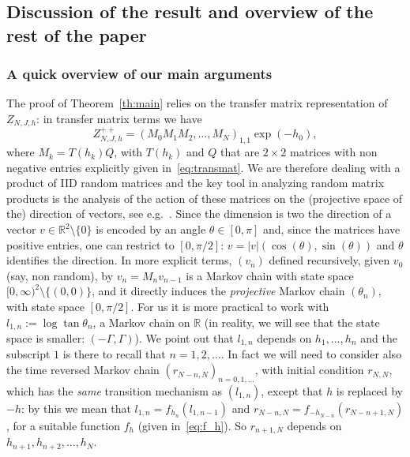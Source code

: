 \documentclass[10pt]{amsart}
\theoremstyle{definition}\newtheorem{defi}[theo]{Definition}\newtheorem{rema}[theo]{Remark}\newtheorem{exam}[theo]{Example}\newtheorem{exem}[theo]{Example}\newtheorem{nota}[theo]{Notation}
\newcommand{\bbR}{\mathbb{R}}
\newcommand{\gG}{\Gamma}
\begin{document}
\subsection{Discussion of the result and overview of the rest of the paper}\label{sec:overview}

\subsubsection{A quick overview of our main arguments}

The proof of Theorem~\ref{th:main} relies on the transfer matrix representation of $Z_{N, J, h}$: in transfer matrix terms we have
\begin{equation}
Z^{++}_{N, J, h}= (M_0M_1M_2,\dots, M_N)_{1,1}\exp\left(-h_0\right),
\end{equation}
where $M_k=T(h_k)Q$, with $T(h_k)$ and $Q$ that are $2\times 2$ matrices with non negative entries explicitly given in~\eqref{eq:transmat}. We are therefore dealing with a product of IID random matrices and the key tool in analyzing random matrix products is the analysis of the action of these matrices on the (projective space of the) direction of vectors, see e.g.~\cite{cf:Viana}. Since the dimension is two the direction of a vector $v\in \bbR^2\setminus \{0\}$ is encoded by an angle $\theta\in [0, \pi]$ and, since the matrices have positive entries, \linebreak one can restrict to $[0, \pi/2]$: $v = |v|(\cos(\theta), \sin(\theta))$ and $\theta$ identifies the direction. In more explicit terms, $(v_n)$ defined recursively, given $v_0$ (say, non random), by $v_{n}=M_{n} v_{n-1}$ is a Markov chain with state space $[0, \infty)^2\setminus \{(0,0)\}$, and it directly induces the \emph{projective} Markov chain $(\theta_n)$, with state space $[0,\pi/2]$. For us it is more practical to work with $l_{1, n}:= \log \tan\theta_n$, a Markov chain on $\bbR$ (in reality, we will see that the state space is smaller: $(-\gG, \gG)$). We point out that $l_{1,n}$ depends on $h_1, \dots, h_n$ and the subscript $1$ is there to recall that $n=1, 2, \dots$. In fact we will need to consider also the time reversed Markov chain $(r_{N-n, N})_{n=0,1, \dots}$, with initial condition $r_{N,N}$, which has the \emph{same} transition mechanism as $(l_{1,n})$, except that $h$ is replaced by $-h$: by this we mean that $l_{1, n}=f_{h_n}(l_{1, n-1})$ and $r_{N-n, N}=f_{-h_{N-n}}(r_{N- n+1, N})$, for a suitable function $f_h$ (given in~\eqref{eq:f_h}). So $r_{n+1, N}$ depends on $h_{n+1}, h_{n+2}, \dots, h_{N}$.
\end{document}
